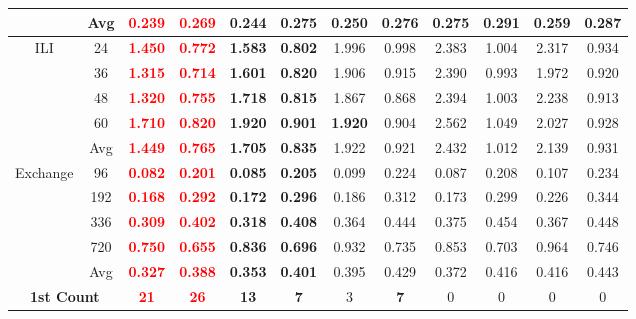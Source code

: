 \begin{table}[!htbp]
\begin{tabular}{c|c|cc|cc|cc|cc|cc}
& Avg & \textbf{\textcolor{red}{0.239}} & \textbf{\textcolor{red}{0.269}} & \textbf{0.244} & \textbf{0.275} & 0.250 & 0.276 & 0.275 & 0.291 & 0.259 & 0.287 \\
\midrule
\multirow{5}{*}{ILI}
& 24 & \textbf{\textcolor{red}{1.450}} & \textbf{\textcolor{red}{0.772}} & \textbf{1.583} & \textbf{0.802} & 1.996 & 0.998 & 2.383 & 1.004 & 2.317 & 0.934 \\
& 36 & \textbf{\textcolor{red}{1.315}} & \textbf{\textcolor{red}{0.714}} & \textbf{1.601} & \textbf{0.820} & 1.906 & 0.915 & 2.390 & 0.993 & 1.972 & 0.920 \\
& 48 & \textbf{\textcolor{red}{1.320}} & \textbf{\textcolor{red}{0.755}} & \textbf{1.718} & \textbf{0.815} & 1.867 & 0.868 & 2.394 & 1.003 & 2.238 & 0.913 \\
& 60 & \textbf{\textcolor{red}{1.710}} & \textbf{\textcolor{red}{0.820}} & \textbf{1.920} & \textbf{0.901} & \textbf{1.920} & 0.904 & 2.562 & 1.049 & 2.027 & 0.928 \\
& Avg & \textbf{\textcolor{red}{1.449}} & \textbf{\textcolor{red}{0.765}} & \textbf{1.705} & \textbf{0.835} & 1.922 & 0.921 & 2.432 & 1.012 & 2.139 & 0.931 \\
\midrule
\multirow{5}{*}{Exchange}
& 96 & \textbf{\textcolor{red}{0.082}} & \textbf{\textcolor{red}{0.201}} & \textbf{0.085} & \textbf{0.205} & 0.099 & 0.224 & 0.087 & 0.208 & 0.107 & 0.234 \\
& 192 & \textbf{\textcolor{red}{0.168}} & \textbf{\textcolor{red}{0.292}} & \textbf{0.172} & \textbf{0.296} & 0.186 & 0.312 & 0.173 & 0.299 & 0.226 & 0.344 \\
& 336 & \textbf{\textcolor{red}{0.309}} & \textbf{\textcolor{red}{0.402}} & \textbf{0.318} & \textbf{0.408} & 0.364 & 0.444 & 0.375 & 0.454 & 0.367 & 0.448 \\
& 720 & \textbf{\textcolor{red}{0.750}} & \textbf{\textcolor{red}{0.655}} & \textbf{0.836} & \textbf{0.696} & 0.932 & 0.735 & 0.853 & 0.703 & 0.964 & 0.746 \\
& Avg & \textbf{\textcolor{red}{0.327}} & \textbf{\textcolor{red}{0.388}} & \textbf{0.353} & \textbf{0.401} & 0.395 & 0.429 & 0.372 & 0.416 & 0.416 & 0.443 \\
\midrule
\multicolumn{2}{c|}{\textbf{1st Count}} & \textbf{\textcolor{red}{21}} & \textbf{\textcolor{red}{26}} & \textbf{13} & \textbf{7} & 3 & \textbf{7} & 0 & 0 & 0 & 0 \\
\bottomrule
\end{tabular}
\end{table}

